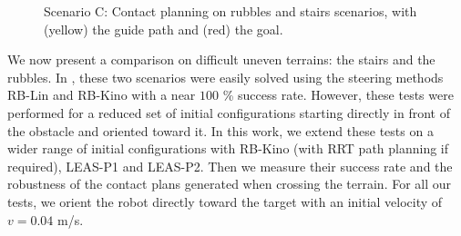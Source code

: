 \begin{figure}[H]
\begin{subfigure}[t]{0.45\linewidth}
    \end{subfigure}
    \caption{Scenario C: Contact planning on rubbles and stairs scenarios, with (yellow) the guide path and (red) the goal.}
    \label{fig:cp-sb:talos_stairs_rubbles_example}
\end{figure}
We now present a comparison on difficult uneven terrains: the stairs and the rubbles.
In \cite{AcyclicCP}, these two scenarios were easily solved using the steering methods RB-Lin and RB-Kino with a near $100$ \% success rate. 
However, these tests were performed for a reduced set of initial configurations starting directly in front of the obstacle and oriented toward it. 
In this work, we extend these tests on a wider range of initial configurations with RB-Kino (with RRT path planning if required), LEAS-P1 and LEAS-P2. Then we measure their success rate and the robustness of the contact plans generated when crossing the terrain.
For all our tests, we orient the robot directly toward the target with an initial velocity of $v=0.04$ m/s. \hfill \break

